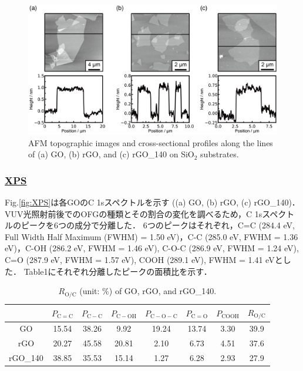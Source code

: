 \documentclass[platex,dvipdfmx]{jlreq}			%
\begin{document}
\begin{figure}
    \centering
    \includegraphics[width=150mm]{figures/figure2.png}
    \caption{AFM topographic images and cross-sectional profiles along the lines of (a) GO, (b) rGO, and (c) rGO\_140 on SiO$_2$ substrates.}
    \label{fig:AFM}
\end{figure}

\subsubsection*{\ul{XPS}}
Fig.\ref{fig:XPS}は各GOのC 1sスペクトルを示す ((a) GO, (b) rGO, (c) rGO\_140)．
VUV光照射前後でのOFGの種類とその割合の変化を調べるため，C 1sスペクトルのピークを6つの成分で分離した\supercite{tu_vacuum-ultraviolet_2015}．
6つのピークはそれぞれ，C=C (284.4 eV, Full Width Half Maximum (FWHM) = 1.50 eV)，C-C (285.0 eV, FWHM = 1.36 eV)，C-OH (286.2 eV, FWHM = 1.46 eV), C-O-C (286.9 eV, FWHM = 1.24 eV), C=O (287.9 eV, FWHM = 1.57 eV), COOH (289.1 eV), FWHM = 1.41 eVとした．
Table1にそれぞれ分離したピークの面積比を示す．

\begin{table}[H]
    \centering
    \caption{$R_{\mathrm{O/C}}$ (unit: \%) of GO, rGO, and rGO\_140.}
    \label{tab:xps}
    \begin{tabular}{|c|c|c|c|c|c|c|c|}
        \hline
        ~        & $P_{\mathrm{C=C}}$ & $P_{\mathrm{C-C}}$ & $P_{\mathrm{C-OH}}$ & $P_{\mathrm{C-O-C}}$ & $P_{\mathrm{C=O}}$ & $P_{\mathrm{COOH}}$ & $R_{\mathrm{O/C}}$ \\ \hline
        GO       & 15.54              & 38.26              & 9.92                & 19.24                & 13.74              & 3.30                & 39.9 \\ \hline
        rGO      & 20.27              & 45.58              & 20.81               & 2.10                 & 6.73               & 4.51                & 37.6 \\ \hline
        rGO\_140 & 38.85              & 35.53              & 15.14               & 1.27                 & 6.28               & 2.93                & 27.9 \\ \hline
    \end{tabular}
\end{table}
  
\end{document}
